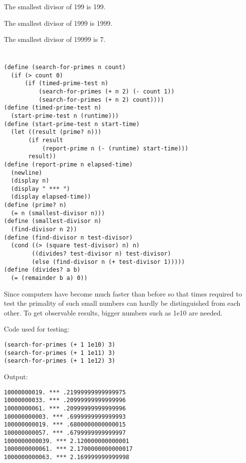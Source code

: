 \documentclass[../main.tex]{subfiles}
\begin{document}
The smallest divisor of 199 is 199.

The smallest divisor of 1999 is 1999.

The smallest divisor of 19999 is 7.


\section{}

\begin{lstlisting}
(define (search-for-primes n count)
  (if (> count 0)
      (if (timed-prime-test n)
          (search-for-primes (+ n 2) (- count 1))
          (search-for-primes (+ n 2) count))))
(define (timed-prime-test n)
  (start-prime-test n (runtime)))
(define (start-prime-test n start-time)
  (let ((result (prime? n)))
       (if result
           (report-prime n (- (runtime) start-time)))
       result))
(define (report-prime n elapsed-time)
  (newline)
  (display n)
  (display " *** ")
  (display elapsed-time))
(define (prime? n)
  (= n (smallest-divisor n)))
(define (smallest-divisor n)
  (find-divisor n 2))
(define (find-divisor n test-divisor)
  (cond ((> (square test-divisor) n) n)
        ((divides? test-divisor n) test-divisor)
        (else (find-divisor n (+ test-divisor 1)))))
(define (divides? a b)
  (= (remainder b a) 0))
\end{lstlisting}

Since computers have become much faster than before so that
 times required to test the primality of such small numbers
 can hardly be distinguished from each other. To get observable
 results, bigger numbers such as 1e10 are needed.

Code used for testing:

\begin{lstlisting}
(search-for-primes (+ 1 1e10) 3)
(search-for-primes (+ 1 1e11) 3)
(search-for-primes (+ 1 1e12) 3)
\end{lstlisting}

Output:

\begin{lstlisting}
10000000019. *** .21999999999999975
10000000033. *** .20999999999999996
10000000061. *** .20999999999999996
100000000003. *** .6999999999999993
100000000019. *** .6800000000000015
100000000057. *** .6799999999999997
1000000000039. *** 2.120000000000001
1000000000061. *** 2.1700000000000017
1000000000063. *** 2.169999999999998
\end{lstlisting}
\end{document}

